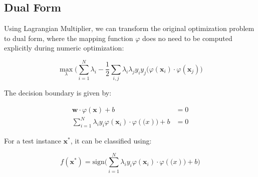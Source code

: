 \begin{multicols*}{2}
\section{Dual Form}

\noindent Using Lagrangian Multiplier, we can transform the original optimization problem to dual form, where the mapping function $\varphi$ does no need to be computed explicitly during numeric optimization:

$$\!\max_{\lambda} \Big( \sum_{i=1}^N \lambda_i - \frac{1}{2} \sum_{i,j} \lambda_i \lambda_j y_i y_j (\varphi(\mathbf{x}_i) \cdot \varphi(\mathbf{x}_j)  \Big)$$

\noindent The decision boundary is given by:

\begin{equation*}
\begin{split}
    \mathbf{w} \cdot \varphi(\mathbf{x}) + b &= 0\\
    \sum_{i=1}^N \lambda_i y_i \varphi(\mathbf{x}_i) \cdot \varphi(\mathbf(x)) + b &= 0
\end{split}
\end{equation*}

\noindent For a test instance $\mathbf{x}^*$, it can be classified using:

$$f(\mathbf{x}^*)= \text{sign} \Bigg( \sum_{i=1}^N \lambda_i y_i \varphi(\mathbf{x}_i) \cdot \varphi(\mathbf(x)) + b \Bigg)$$


\end{multicols*}
